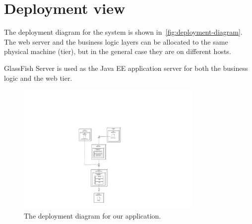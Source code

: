 \section{Deployment view}
\label{sec:deployment-view}

The deployment diagram for the system is shown in~\autoref{fig:deployment-diagram}.
The web server and the business logic layers can be allocated to the same physical machine (tier), but in the general case they are on different hosts.

GlassFish Server is used as the Java EE application server for both the business logic and the web tier.
\begin{figure}
\centering
\includegraphics[width=0.8\textwidth]{diagrams/deployment_diagram}
\caption{The deployment diagram for our application.}
\label{fig:deployment-diagram}
\end{figure}
